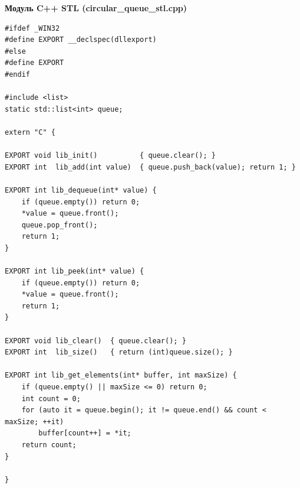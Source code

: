 \documentclass[oneside,a4paper,14pt]{extarticle}
\begin{document}
\newpage
\textbf{Модуль C++ STL (circular\_queue\_stl.cpp)}
\small
\begin{verbatim}
#ifdef _WIN32
#define EXPORT __declspec(dllexport)
#else
#define EXPORT
#endif

#include <list>
static std::list<int> queue;

extern "C" {

EXPORT void lib_init()          { queue.clear(); }
EXPORT int  lib_add(int value)  { queue.push_back(value); return 1; }

EXPORT int lib_dequeue(int* value) {
    if (queue.empty()) return 0;
    *value = queue.front();
    queue.pop_front();
    return 1;
}

EXPORT int lib_peek(int* value) {
    if (queue.empty()) return 0;
    *value = queue.front();
    return 1;
}

EXPORT void lib_clear()  { queue.clear(); }
EXPORT int  lib_size()   { return (int)queue.size(); }

EXPORT int lib_get_elements(int* buffer, int maxSize) {
    if (queue.empty() || maxSize <= 0) return 0;
    int count = 0;
    for (auto it = queue.begin(); it != queue.end() && count < maxSize; ++it)
        buffer[count++] = *it;
    return count;
}

}
\end{verbatim}
\end{document}
